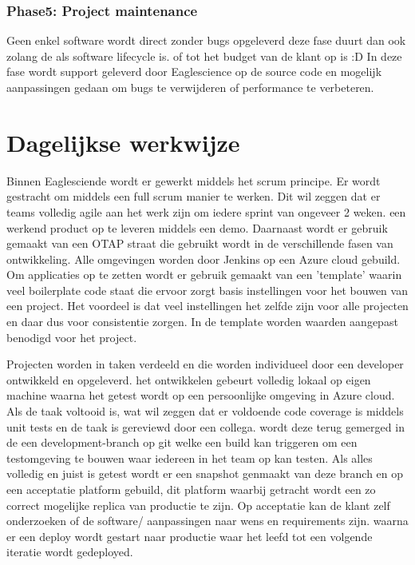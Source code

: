 \subsubsection{Phase5: Project maintenance}
Geen enkel software wordt direct zonder bugs opgeleverd deze fase duurt dan ook zolang de als software lifecycle is. of tot het budget van de klant op is :D In deze fase wordt support geleverd door Eaglescience op de source code en mogelijk aanpassingen gedaan om bugs te verwijderen of performance te verbeteren.

\section{Dagelijkse werkwijze}
Binnen Eaglesciende wordt er gewerkt middels het scrum principe. Er wordt gestracht om middels een full scrum manier te werken. Dit wil zeggen dat er teams volledig agile aan het werk zijn om iedere sprint van ongeveer 2 weken. een werkend product op te leveren middels een demo. Daarnaast wordt er gebruik gemaakt van een OTAP straat die gebruikt wordt in de verschillende fasen van ontwikkeling. Alle omgevingen worden door Jenkins op een Azure cloud gebuild. Om applicaties op te zetten wordt er gebruik gemaakt van een 'template' waarin veel boilerplate code staat die ervoor zorgt basis instellingen voor het bouwen van een project. Het voordeel is dat veel instellingen het zelfde zijn voor alle projecten en daar dus voor consistentie zorgen. In de template worden waarden aangepast benodigd voor het project.

Projecten worden in taken verdeeld en die worden individueel door een developer ontwikkeld en opgeleverd. het ontwikkelen gebeurt volledig lokaal op eigen machine waarna het getest wordt op een persoonlijke omgeving in Azure cloud. Als de taak voltooid is, wat wil zeggen dat er voldoende code coverage is middels unit tests en de taak is gereviewd door een collega. wordt deze terug gemerged in de een development-branch op git welke een build kan triggeren om een testomgeving te bouwen waar iedereen in het team op kan testen. Als alles volledig en juist is getest wordt er een snapshot genmaakt van deze branch en op een acceptatie platform gebuild, dit platform waarbij getracht wordt een zo correct mogelijke replica van productie te zijn. Op acceptatie kan de klant zelf onderzoeken of de software/ aanpassingen naar wens en requirements zijn. waarna er een deploy wordt gestart naar productie waar het leefd tot een volgende iteratie wordt gedeployed.

